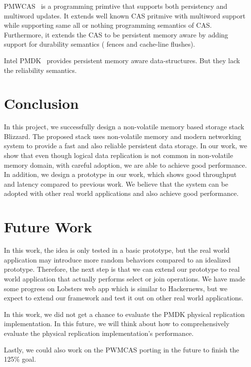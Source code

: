 PMWCAS~\cite{pmwcas} is a programming primtive that supports both persistency and multiword updates.
It extends well known CAS pritmive with multiword support while supporting same all or nothing
programming semantics of CAS. Furthermore, it extends the CAS to be persistent memory aware by
adding support for durability semantics ( fences and cache-line flushes).

Intel PMDK~\cite{pmdk} provides persistent memory aware data-structures. But they lack the reliability semantics.

\section{Conclusion}
In this project, we successfully design a non-volatile memory based storage stack Blizzard. The proposed stack uses non-volatile memory and modern networking system to provide a fast and also reliable persistent data storage. In our work, we show that even though logical data replication is not common in non-volatile memory domain, with careful adoption, we are able to achieve good performance. In addition, we design a prototype in our work, which shows good throughput and latency compared to previous work. We believe that the system can be adopted with other real world applications and also achieve good performance. 

\section{Future Work}
In this work, the idea is only tested in a basic prototype, but the real world application may introduce more random behaviors compared to an idealized prototype. Therefore, the next step is that we can extend our prototype to real world application that actually performs select or join operations. We have made some progress on Lobsters web app which is similar to Hackernews, but we expect to extend our framework and test it out on other real world applications. 

In this work, we did not get a chance to evaluate the PMDK physical replication implementation. In this future, we will think about how to comprehensively evaluate the physical replication implementation's performance. 

Lastly, we could also work on the PWMCAS porting in the future to finish the 125$\%$ goal.
